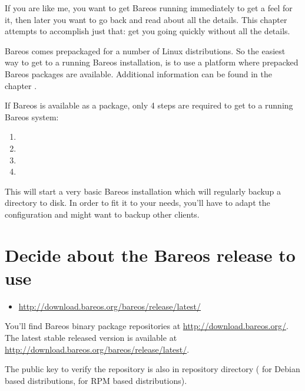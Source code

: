 If you are like me, you want to get Bareos running immediately to get a feel
for it, then later you want to go back and read about all the details. This
chapter attempts to accomplish just that: get you going quickly without all
the details.

Bareos comes prepackaged for a number of Linux distributions.
So the easiest way to get to a running Bareos installation, 
is to use a platform where prepacked Bareos packages are available.
Additional information can be found in the chapter .


If Bareos is available as a package, 
only 4 steps are required to get to a running Bareos system:
\begin{enumerate}
    \item {}
    \item {}
    \item {}
    \item {}
\end{enumerate}

This will start a very basic Bareos installation which will regularly backup a directory to disk.
In order to fit it to your needs, you'll have to adapt the configuration and might want to backup other clients.

\section{Decide about the Bareos release to use}
    \label{sec:AddSoftwareRepository}

\begin{itemize}
   \item \url{http://download.bareos.org/bareos/release/latest/}
\end{itemize}

You'll find Bareos binary package repositories at \url{http://download.bareos.org/}.
The latest stable released version is available at \url{http://download.bareos.org/bareos/release/latest/}.

The public key to verify the repository is also in repository directory
( for Debian based distributions,  for RPM based distributions).

